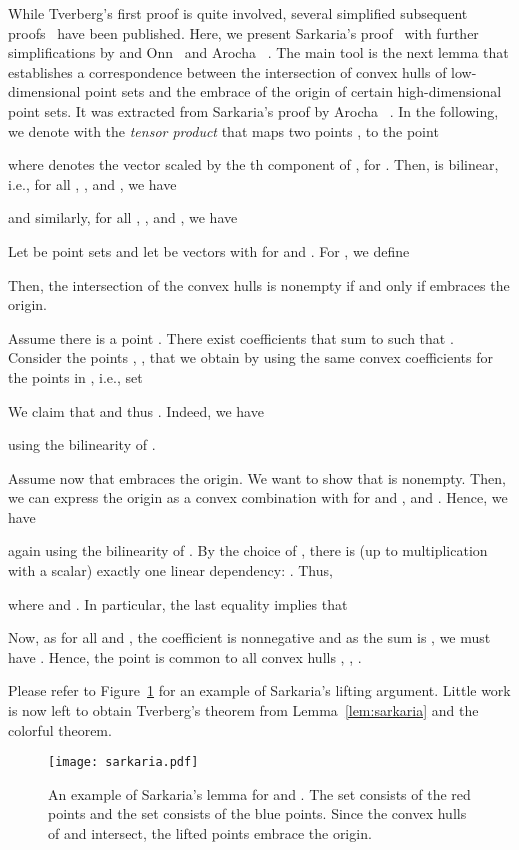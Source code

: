 While Tverberg's first proof is quite involved, several
simplified subsequent 
proofs~\cite{Tverberg1981,TverbergVr1993,Sarkaria1992,Roudneff2001} 
have been published.
Here, we present Sarkaria's proof~\cite{Sarkaria1992} with further
simplifications by \Barany and Onn~\cite{BaranyOn1997} and Arocha
\etal~\cite{ArochaBaBrFaMo2009}.
The main tool is the next lemma that establishes a correspondence 
between the intersection of convex hulls of low-dimensional point sets
and the embrace of the origin of certain high-dimensional
point sets. It was extracted from Sarkaria's proof by Arocha
\etal~\cite{ArochaBaBrFaMo2009}. In the following, we denote with 
 the \emph{tensor product} that maps two points 
,  to the point

where  denotes the vector  scaled by the th component
of , for .
Then,  is bilinear, i.e., for all , , and , we have

and similarly, for all , , and
, we have


\begin{lemma}
\label{lem:sarkaria}
Let  be  point sets and 
let  be  vectors with  for  and
. For , we define

Then, the intersection of the convex hulls  
is nonempty if and only if  embraces the origin.
\end{lemma}
\begin{prf}
  Assume there is a point .
  There exist coefficients
   that sum to  such that
  .
  Consider the points , , 
  that we obtain by using the same convex coefficients for the points 
  in , i.e., set

We claim that  and thus
. Indeed, we have

using the bilinearity of  .

Assume now that  embraces the origin. 
We want to show that  is nonempty. 
Then, we can express the origin as a convex combination  with
 for  and , and . Hence, we have

again using the bilinearity of .
By the choice of , there is (up to multiplication 
with a scalar) exactly one linear dependency: .
Thus,

where  and . In particular, the last equality
implies that

Now, as for all  and , the coefficient
 is nonnegative and as the sum  is , we must have 
. Hence,
the point  is common to all convex
hulls , , .
\end{prf}

Please refer to Figure~\ref{fig:sarkaria} for an example of Sarkaria's 
lifting argument.  Little work is now left to obtain Tverberg's theorem 
from Lemma~\ref{lem:sarkaria} and the colorful \Caratheodory theorem.
\begin{figure}[htbp]
  \begin{center}
    \texttt{[image: sarkaria.pdf]}
  \end{center}
  \caption[Example of Sarkaria's Lemma.]{An example of Sarkaria's lemma for
   and . The set 
  consists of the red points and the set  consists of the blue points.
  Since the convex hulls of  and  intersect, the lifted points 
  embrace the origin.}
  \label{fig:sarkaria}
\end{figure}

